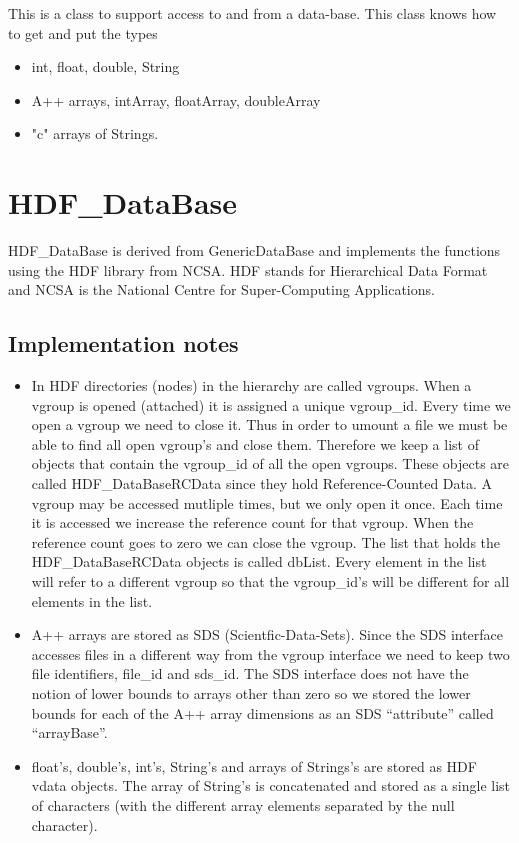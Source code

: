 \documentclass{article}
\begin{document}
 This is a class to support access to and from a data-base.
This class knows how to get and put the types
\begin{itemize}
  \item int, float, double, String
  \item A++ arrays, intArray, floatArray, doubleArray
  \item "c" arrays of Strings.
\end{itemize}



\vfill\eject
\section{HDF\_DataBase}

HDF\_DataBase is derived from GenericDataBase and implements the
functions using the HDF library from NCSA. HDF stands for
Hierarchical Data Format and NCSA is the National Centre for
Super-Computing Applications.


\subsection{Implementation notes}

\begin{itemize}
 \item   In HDF directories (nodes) in the hierarchy are called vgroups.
  When a vgroup is opened (attached) it is assigned a unique {\ff vgroup\_id}. 
  Every time we open a vgroup we need to close it. Thus in order to {\ff umount}
  a file we must be able to find all open vgroup's and close them. 
  Therefore we keep a list of objects that contain the {\ff vgroup\_id}
  of all the open vgroups. These objects are called {\ff HDF\_DataBaseRCData}
  since they hold Reference-Counted Data.
  A vgroup may be accessed mutliple times, but we only open it once. Each time
  it is accessed we increase the reference count for that vgroup.
 When the reference
 count goes to zero we can close the vgroup. The list that holds the 
 {\ff HDF\_DataBaseRCData} objects
  is called {\ff dbList}.
 Every element in the
 list will refer to a different vgroup so that the {\ff vgroup\_id}'s will
 be different for all elements in the list.

 \item A++ arrays are stored as SDS (Scientfic-Data-Sets). Since the SDS
   interface accesses files in a different way from the vgroup interface
  we need to keep two file identifiers, {\ff file\_id} and {\ff sds\_id}.
  The SDS interface does not have the notion of lower bounds to arrays
  other than zero so we stored the lower bounds for each of the A++
  array dimensions as an SDS ``attribute'' called ``arrayBase''.

 \item {\ff float}'s, {\ff double}'s, {\ff int}'s, {\ff String}'s 
  and arrays of {\ff Strings}'s are stored as HDF vdata objects. 
  The array of {\ff String's} is concatenated and stored as a
  single list of characters (with the different array elements separated
 by the null character).
\end{itemize}
\end{document}
